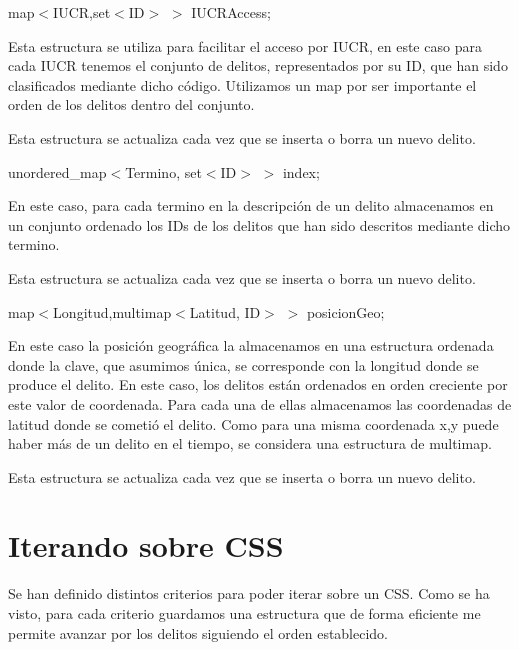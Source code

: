 \begin{DoxyItemize}
\item map$<$I\+U\+C\+R,set$<$\+I\+D$>$ $>$ I\+U\+C\+R\+Access;\end{DoxyItemize}
Esta estructura se utiliza para facilitar el acceso por I\+U\+C\+R, en este caso para cada I\+U\+C\+R tenemos el conjunto de delitos, representados por su I\+D, que han sido clasificados mediante dicho código. Utilizamos un map por ser importante el orden de los delitos dentro del conjunto.

Esta estructura se actualiza cada vez que se inserta o borra un nuevo delito.

\begin{DoxyItemize}
\item unordered\+\_\+map$<$Termino, set$<$\+I\+D$>$ $>$ index;\end{DoxyItemize}
En este caso, para cada termino en la descripción de un delito almacenamos en un conjunto ordenado los I\+Ds de los delitos que han sido descritos mediante dicho termino.

Esta estructura se actualiza cada vez que se inserta o borra un nuevo delito.

\begin{DoxyItemize}
\item map$<$Longitud,multimap$<$\+Latitud, I\+D$>$ $>$ posicion\+Geo;\end{DoxyItemize}
En este caso la posición geográfica la almacenamos en una estructura ordenada donde la clave, que asumimos única, se corresponde con la longitud donde se produce el delito. En este caso, los delitos están ordenados en orden creciente por este valor de coordenada. Para cada una de ellas almacenamos las coordenadas de latitud donde se cometió el delito. Como para una misma coordenada x,y puede haber más de un delito en el tiempo, se considera una estructura de multimap.

Esta estructura se actualiza cada vez que se inserta o borra un nuevo delito.\hypertarget{index_iterando}{}\section{Iterando sobre C\+S\+S}\label{index_iterando}
Se han definido distintos criterios para poder iterar sobre un C\+S\+S. Como se ha visto, para cada criterio guardamos una estructura que de forma eficiente me permite avanzar por los delitos siguiendo el orden establecido.

